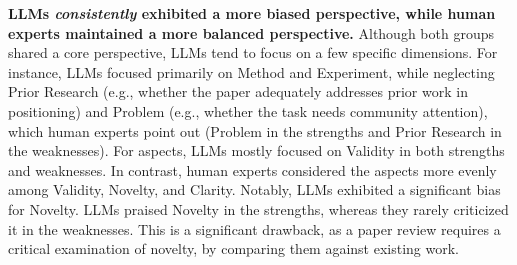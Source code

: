 
\textbf{LLMs \textit{consistently} exhibited a more biased perspective, while human experts maintained a more balanced perspective.} Although both groups shared a core perspective, LLMs tend to focus on a few specific dimensions. For instance, LLMs focused primarily on Method and Experiment, while neglecting Prior Research (e.g., whether the paper adequately addresses prior work in positioning) and Problem (e.g., whether the task needs community attention), which human experts point out (Problem in the strengths and Prior Research in the weaknesses). For aspects, LLMs mostly focused on Validity in both strengths and weaknesses. In contrast, human experts considered the aspects more evenly among Validity, Novelty, and Clarity. Notably, LLMs exhibited a significant bias for Novelty. LLMs praised Novelty in the strengths, whereas they rarely criticized it in the weaknesses. This is a significant drawback, as a paper review requires a critical examination of novelty, by comparing them against existing work.

